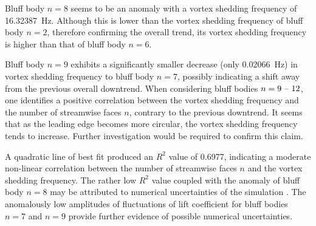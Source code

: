Bluff body $n = 8$ seems to be an anomaly with a vortex shedding frequency of \SI{16.32387}{\hertz}. Although this is lower than the vortex shedding frequency of bluff body $n = 2$, therefore confirming the overall trend, its vortex shedding frequency is higher than that of bluff body $n = 6$. 

Bluff body $n = 9$ exhibits a significantly smaller decrease (only \SI{0.02066}{\hertz}) in vortex shedding frequency to bluff body $n = 7$, possibly indicating a shift away from the previous overall downtrend. When considering bluff bodies $n = 9 \text{ \textendash\ } 12$, one identifies a positive correlation between the vortex shedding frequency and the number of streamwise faces $n$, contrary to the previous downtrend. It seems that as the leading edge becomes more circular, the vortex shedding frequency tends to increase. Further investigation would be required to confirm this claim.

A quadratic line of best fit produced an $R^2$ value of 0.6977, indicating a moderate non-linear correlation between the number of streamwise faces $n$ and the vortex shedding frequency. The rather low $R^2$ value coupled with the anomaly of bluff body $n = 8$ may be attributed to numerical uncertainties of the simulation \parencite{city7565}. The anomalously low amplitudes of fluctuations of lift coefficient for bluff bodies $n = 7$ and $n = 9$ provide further evidence of possible numerical uncertainties.



